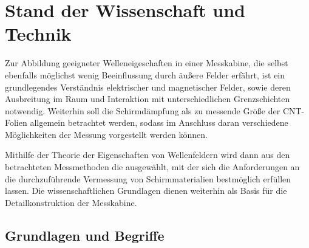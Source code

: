 

\chapter{Stand der Wissenschaft und Technik}\label{cha:2}

Zur Abbildung geeigneter Welleneigeschaften in einer Messkabine, die selbst ebenfalls möglichst wenig Beeinflussung durch äußere Felder erfährt, ist ein grundlegendes Verständnis elektrischer und magnetischer Felder, sowie deren Ausbreitung im Raum und Interaktion mit unterschiedlichen Grenzschichten notwendig. Weiterhin soll die Schirmdämpfung als zu messende Größe der CNT-Folien allgemein betrachtet werden, sodass im Anschluss daran verschiedene Möglichkeiten der Messung vorgestellt werden können. \par
\vspace{\baselineskip}
Mithilfe der Theorie der Eigenschaften von Wellenfeldern wird dann aus den betrachteten Messmethoden die ausgewählt, mit der sich die Anforderungen an die durchzuführende Vermessung von Schirmmaterialien bestmöglich erfüllen lassen. Die wissenschaftlichen Grundlagen dienen weiterhin als Basis für die Detailkonstruktion der Messkabine.


\section{Grundlagen und Begriffe}\label{cha:2_Grundlagen_und_Begriffe}

